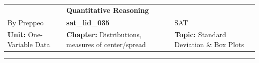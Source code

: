 \documentclass[11pt,paper=a4,answers]{exam}
\begin{document}
\begin{center}
    \centering
    \renewcommand{\arraystretch}{1.5}
    \begin{tabularx}{\textwidth}{YYY}
    & \normalsize\bf{{\Large{{Quantitative Reasoning}}}} & \\
    By Preppeo & \normalsize\bf{{sat\_lid\_035}} & SAT\\
    \normalsize{{\textbf{{Unit:}} One-Variable Data}} & \normalsize{{\textbf{{Chapter:}} Distributions, measures of center/spread}} & \normalsize{{\textbf{{Topic:}} Standard Deviation \& Box Plots}} \\
    \end{tabularx}
\end{center}
\par\noindent\rule{\textwidth}{1pt}
\end{document}
